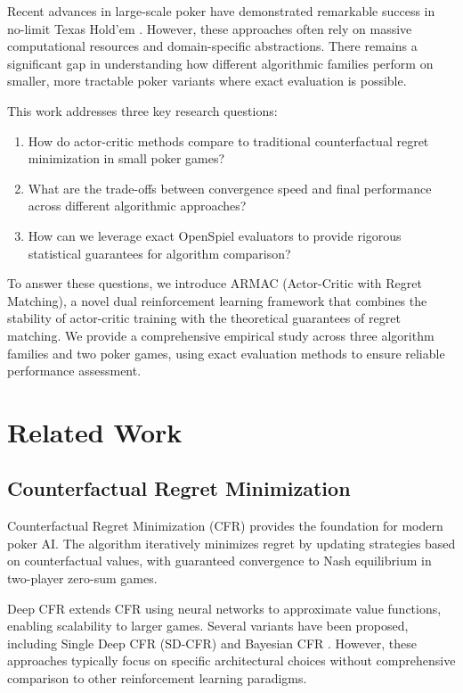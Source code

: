 \documentclass[10pt,twocolumn,conference]{IEEEtran}
\begin{document}
Recent advances in large-scale poker have demonstrated remarkable success in no-limit Texas Hold'em \cite{brown2018deep,blackwell2023solving}. However, these approaches often rely on massive computational resources and domain-specific abstractions. There remains a significant gap in understanding how different algorithmic families perform on smaller, more tractable poker variants where exact evaluation is possible.

This work addresses three key research questions:
\begin{enumerate}
    \item How do actor-critic methods compare to traditional counterfactual regret minimization in small poker games?
    \item What are the trade-offs between convergence speed and final performance across different algorithmic approaches?
    \item How can we leverage exact OpenSpiel evaluators to provide rigorous statistical guarantees for algorithm comparison?
\end{enumerate}

To answer these questions, we introduce ARMAC (Actor-Critic with Regret Matching), a novel dual reinforcement learning framework that combines the stability of actor-critic training with the theoretical guarantees of regret matching. We provide a comprehensive empirical study across three algorithm families and two poker games, using exact evaluation methods to ensure reliable performance assessment.

\section{Related Work}
\label{sec:related_work}

\subsection{Counterfactual Regret Minimization}
Counterfactual Regret Minimization (CFR) \cite{zinkevich2008regret} provides the foundation for modern poker AI. The algorithm iteratively minimizes regret by updating strategies based on counterfactual values, with guaranteed convergence to Nash equilibrium in two-player zero-sum games.

Deep CFR \cite{brown2019deep} extends CFR using neural networks to approximate value functions, enabling scalability to larger games. Several variants have been proposed, including Single Deep CFR (SD-CFR) \cite{steinberger2019single} and Bayesian CFR \cite{brown2020bayesian}. However, these approaches typically focus on specific architectural choices without comprehensive comparison to other reinforcement learning paradigms.
\end{document}
